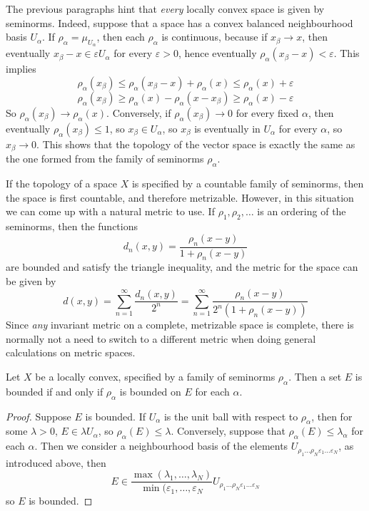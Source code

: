 The previous paragraphs hint that {\it every} locally convex space is given by seminorms. Indeed, suppose that a space has a convex balanced neighbourhood basis $U_\alpha$. If $\rho_\alpha = \mu_{U_\alpha}$, then each $\rho_\alpha$ is continuous, because if $x_\beta \to x$, then eventually $x_\beta - x \in \varepsilon U_\alpha$ for every $\varepsilon > 0$, hence eventually $\rho_\alpha(x_\beta - x) < \varepsilon$. This implies
%
\[ \rho_\alpha(x_\beta) \leq \rho_\alpha(x_\beta - x) + \rho_\alpha(x) \leq \rho_\alpha(x) + \varepsilon \]
\[ \rho_\alpha(x_\beta) \geq \rho_\alpha(x) - \rho_\alpha(x - x_\beta) \geq \rho_\alpha(x) - \varepsilon \]
%
So $\rho_\alpha(x_\beta) \to \rho_\alpha(x)$. Conversely, if $\rho_\alpha(x_\beta) \to 0$ for every fixed $\alpha$, then eventually $\rho_\alpha(x_\beta) \leq 1$, so $x_\beta \in U_\alpha$, so $x_\beta$ is eventually in $U_\alpha$ for every $\alpha$, so $x_\beta \to 0$. This shows that the topology of the vector space is exactly the same as the one formed from the family of seminorms $\rho_\alpha$.

If the topology of a space $X$ is specified by a countable family of seminorms, then the space is first countable, and therefore metrizable. However, in this situation we can come up with a natural metric to use. If $\rho_1, \rho_2, \dots$ is an ordering of the seminorms, then the functions
%
\[ d_n(x,y) = \frac{\rho_n(x - y)}{1 + \rho_n(x-y)} \]
%
are bounded and satisfy the triangle inequality, and the metric for the space can be given by
%
\[ d(x,y) = \sum_{n = 1}^\infty \frac{d_n(x,y)}{2^n} = \sum_{n = 1}^\infty \frac{\rho_n(x-y)}{2^n (1 + \rho_n(x-y))} \]
%
Since {\it any} invariant metric on a complete, metrizable space is complete, there is normally not a need to switch to a different metric when doing general calculations on metric spaces.

\begin{theorem}
    Let $X$ be a locally convex, specified by a family of seminorms $\rho_\alpha$. Then a set $E$ is bounded if and only if $\rho_\alpha$ is bounded on $E$ for each $\alpha$.
\end{theorem}
\begin{proof}
    Suppose $E$ is bounded. If $U_\alpha$ is the unit ball with respect to $\rho_\alpha$, then for some $\lambda > 0$, $E \in \lambda U_\alpha$, so $\rho_\alpha(E) \leq \lambda$. Conversely, suppose that $\rho_\alpha(E) \leq \lambda_\alpha$ for each $\alpha$. Then we consider a neighbourhood basis of the elements $U_{\rho_1 \dots \rho_N \varepsilon_1 \dots \varepsilon_N}$, as introduced above, then
    \[ E \in \frac{\max(\lambda_1, \dots, \lambda_N)}{\min(\varepsilon_1, \dots, \varepsilon_N} U_{\rho_1 \dots \rho_N \varepsilon_1 \dots \varepsilon_N} \]
    so $E$ is bounded.
\end{proof}

